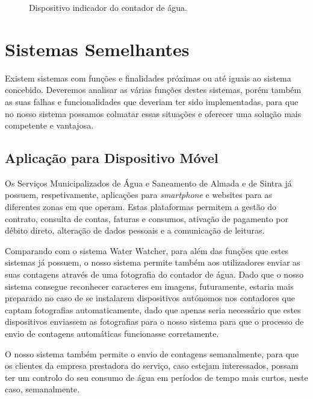 \begin{figure}[h!]
\begin{center}
\caption{Dispositivo indicador do contador de água.}
\label{fig:contador}
\end{center}
\end{figure}

\section{Sistemas Semelhantes} \label{sec:semelhantes}
Existem sistemas com funções e finalidades próximas ou até iguais ao sistema concebido. Deveremos analisar as várias funções destes sistemas, porém também as suas falhas e funcionalidades que deveriam ter sido implementadas, para que no nosso sistema possamos colmatar essas situações e oferecer uma solução mais competente e vantajosa.

\subsection{Aplicação para Dispositivo Móvel} \label{par:appsmas}
Os Serviços Municipalizados de Água e Saneamento de Almada e de Sintra já possuem, respetivamente, aplicações para \textit{smartphone} \cite{smas:almada} e websites \cite{smas:sintra} para as diferentes zonas em que operam. Estas plataformas permitem a gestão do contrato, consulta de contas, faturas e consumos, ativação de pagamento por débito direto, alteração de dados pessoais e a comunicação de leituras.\par
Comparando com o sistema Water Watcher, para além das funções que estes sistemas já possuem, o nosso sistema permite também aos utilizadores enviar as suas contagens através de uma fotografia do contador de água. Dado que o nosso sistema consegue reconhecer caracteres em imagens, futuramente, estaria mais preparado no caso de se instalarem dispositivos autónomos nos contadores que captam fotografias automaticamente, dado que apenas seria necessário que estes dispositivos enviassem as fotografias para o nosso sistema para que o processo de envio de contagens automáticas funcionasse corretamente.\par
O nosso sistema também permite o envio de contagens semanalmente, para que os clientes da empresa prestadora do serviço, caso estejam interessados, possam ter um controlo do seu consumo de água em períodos de tempo mais curtos, neste caso, semanalmente.

